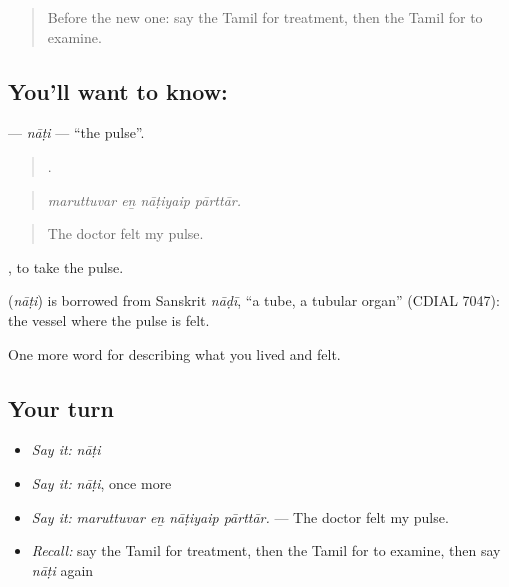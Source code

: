 \label{lesson:TA-C475-nati}



\begin{quote}
Before the new one: say the Tamil for treatment, then the Tamil for to examine.
\end{quote}

\subsection*{You'll want to know: }
\textbf{} — \emph{nāṭi} — \textquotedblleft{}the pulse\textquotedblright{}.

\begin{quote}
   .
\end{quote}

\begin{quote}
\emph{maruttuvar eṉ nāṭiyaip pārttār.}
\end{quote}

\begin{quote}
The doctor felt my pulse.
\end{quote}

 , to take the pulse.

\begin{cousinweb}
\textbf{} (\emph{nāṭi}) is borrowed from Sanskrit \emph{nāḍī}, \textquotedblleft{}a tube, a tubular organ\textquotedblright{} (CDIAL 7047): the vessel where the pulse is felt.
\end{cousinweb}

\begin{grammarlens}[title={What you've built}]
One more word for describing what you lived and felt.
\end{grammarlens}

\subsection*{Your turn}
\begin{itemize}
\raggedright
  \item \emph{Say it:} \emph{nāṭi}
  \item \emph{Say it:} \emph{nāṭi}, once more
  \item \emph{Say it:} \emph{maruttuvar eṉ nāṭiyaip pārttār.} — The doctor felt my pulse.
  \item \emph{Recall:} say the Tamil for treatment, then the Tamil for to examine, then say \emph{nāṭi} again
\end{itemize}

